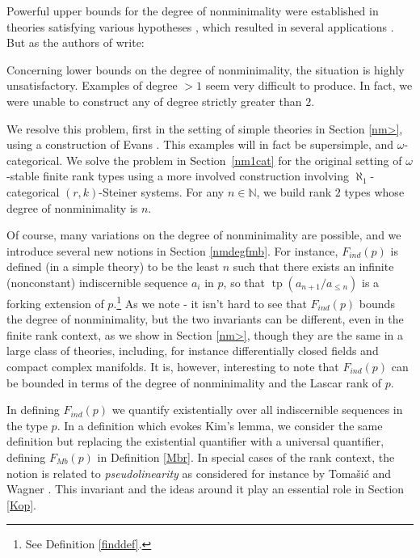 \documentclass[11pt]{amsart}
\newcommand{\Fmb}[1]{F_{Mb}\left( #1  \right)}
\DeclareMathOperator{\tp}{tp}
\theoremstyle{definition}
\theoremstyle{remark}
\newcommand{\m}{\mathbb }
\numberwithin{equation}{section}
\begin{document}
Powerful upper bounds for the degree of nonminimality were established in theories satisfying various hypotheses \cite{freitag2023degree}, which resulted in several applications \cite{freitag2022any, devilbiss2023generic}. But as the authors of \cite{freitag2023bounding} write: 
\begin{displayquote}
Concerning lower bounds on the degree of nonminimality, the situation is highly unsatisfactory. Examples of degree $>1$ seem very difficult to produce. In fact, we were unable to construct any of degree strictly greater than $2$.
\end{displayquote}
We resolve this problem, first in the setting of simple theories in Section \ref{nm>}, using a construction of Evans \cite{Ev02}. This examples will in fact be supersimple, and $\omega$-categorical. We solve the problem in Section~\ref{nm1cat} for the original setting of $\omega$-stable finite rank types using a more involved construction involving $\aleph_1$-categorical $(r,k)$-Steiner systems. For any $n \in \m N$, we build rank $2$ types whose degree of nonminimality is $n$. 

Of course, many variations on the degree of nonminimality are possible, and we introduce several new notions in Section \ref{nmdegfmb}. For instance, $F_{ind}(p) $ is defined (in a simple theory) to be the least $n$ such that there exists an infinite (nonconstant) indiscernible sequence $a_i$ in $p$, so that $\tp (a_{n+1}/a _{\leq n})$ is a forking extension of $p$.\footnote{See Definition \ref{finddef}.} As we note - it isn't hard to see that $F_{ind}(p) $ bounds the degree of nonminimality, but the two invariants can be different, even in the finite rank context, as we show in Section \ref{nm>}, though they are the same in a large class of theories, including, for instance differentially closed fields and compact complex manifolds. It is, however, interesting to note that $F_{ind} (p) $ can be bounded in terms of the degree of nonminimality and the Lascar rank of $p.$ 

In defining $F_{ind} (p)$ we quantify existentially over all indiscernible sequences in the type $p$. In a definition which evokes Kim's lemma, we consider the same definition but replacing the existential quantifier with a universal quantifier, defining $\Fmb {p}$ in Definition \ref{Mbr}. In special cases of the rank context, the notion is related to \emph{pseudolinearity} as considered for instance by Tomašić and Wagner \cite{TW03}. This invariant and the ideas around it play an essential role in Section \ref{Kop}. 
\end{document}
